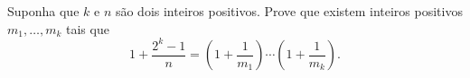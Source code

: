 Suponha que $k$ e $n$ são dois inteiros positivos. Prove que existem inteiros positivos $m_1 , \dots , m_k$ tais que \[1+\frac{2^k-1}{n}=\left(1+\frac1{m_1}\right)\cdots \left(1+\frac1{m_k}\right).\]
